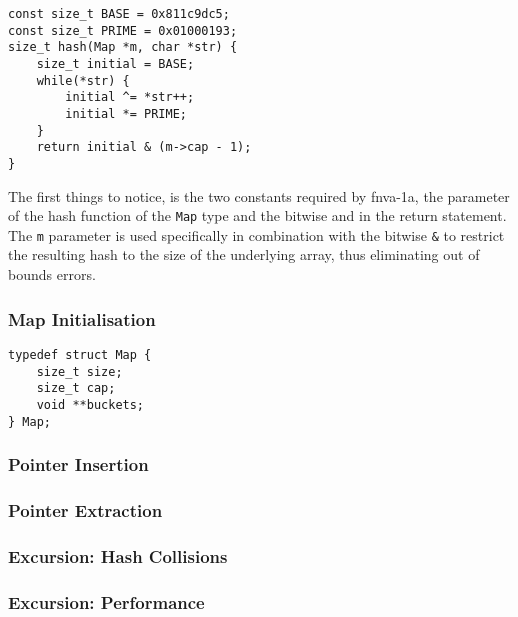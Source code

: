     \begin{verbatim}
const size_t BASE = 0x811c9dc5;
const size_t PRIME = 0x01000193;
size_t hash(Map *m, char *str) {
    size_t initial = BASE;
    while(*str) {
        initial ^= *str++;
        initial *= PRIME;
    }
    return initial & (m->cap - 1);
}
    \end{verbatim}

    The first things to notice, is the two constants required by fnva-1a, the
    parameter of the hash function of the \texttt{Map} type and the bitwise and
    in the return statement. The \texttt{m} parameter is used specifically in
    combination with the bitwise \texttt{\&} to restrict the resulting hash to
    the size of the underlying array, thus eliminating out of bounds errors.

    \subsubsection*{Map Initialisation}

    \begin{verbatim}
typedef struct Map { 
    size_t size;
    size_t cap;
    void **buckets; 
} Map;
    \end{verbatim}

    \subsubsection*{Pointer Insertion}
    \subsubsection*{Pointer Extraction}
    \subsubsection*{Excursion: Hash Collisions}
    \subsubsection*{Excursion: Performance}


